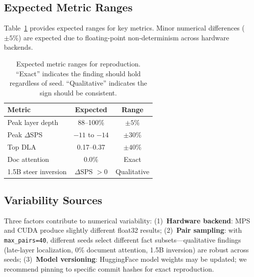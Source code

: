 \documentclass{article}
\begin{document}
\subsection{Expected Metric Ranges}

Table~\ref{tab:reproduce} provides expected ranges for key metrics. Minor numerical differences ($\pm5\%$) are expected due to floating-point non-determinism across hardware backends.

\begin{table}[htbp]
\centering
\small
\begin{tabular}{lcc}
\toprule
\textbf{Metric} & \textbf{Expected} & \textbf{Range} \\
\midrule
Peak layer depth & 88--100\% & $\pm 5\%$ \\
Peak $\Delta$SPS & $-11$ to $-14$ & $\pm 30\%$ \\
Top DLA & 0.17--0.37 & $\pm 40\%$ \\
Doc attention & 0.0\% & Exact \\
1.5B steer inversion & $\Delta$SPS $> 0$ & Qualitative \\
\bottomrule
\end{tabular}
\caption{Expected metric ranges for reproduction. ``Exact'' indicates the finding should hold regardless of seed. ``Qualitative'' indicates the sign should be consistent.}
\label{tab:reproduce}
\end{table}

\subsection{Variability Sources}

Three factors contribute to numerical variability: (1)~\textbf{Hardware backend}: MPS and CUDA produce slightly different float32 results; (2)~\textbf{Pair sampling}: with \texttt{max\_pairs=40}, different seeds select different fact subsets---qualitative findings (late-layer localization, 0\% document attention, 1.5B inversion) are robust across seeds; (3)~\textbf{Model versioning}: HuggingFace model weights may be updated; we recommend pinning to specific commit hashes for exact reproduction.
\end{document}
